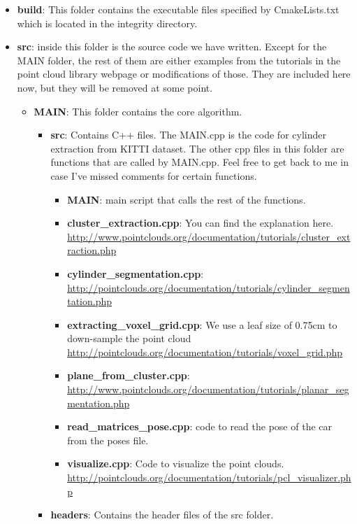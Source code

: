 \documentclass[twoside]{article}
\begin{document}
\begin{itemize}
\item \textbf{build}: This folder contains the executable files specified by CmakeLists.txt  which is located in the integrity directory.
\item \textbf{src}: inside this folder is the source code we have written. Except for the MAIN folder, the rest of them are either examples from the tutorials in the point cloud library webpage or modifications of those. They are included here now, but they will be removed at some point. 

\begin{itemize}
	\item \textbf{MAIN}: This folder contains the core algorithm. 
	\begin{itemize}
		\item \textbf{src}: Contains C++ files. The MAIN.cpp is the code for cylinder extraction from KITTI dataset. The other cpp files in this folder are functions that are called by MAIN.cpp. Feel free to get back to me in case I’ve missed comments for certain functions.
		\begin{itemize}
			\item \textbf{MAIN}: main script that calls the rest of the functions.
			\item \textbf{cluster\_extraction.cpp}: You can find the explanation here. \url{http://www.pointclouds.org/documentation/tutorials/cluster_extraction.php}
			\item \textbf{cylinder\_segmentation.cpp}: \url{http://pointclouds.org/documentation/tutorials/cylinder\_segmentation.php}
			\item \textbf{extracting\_voxel\_grid.cpp}: We use a leaf size of 0.75cm to down-sample the point cloud \url{http://pointclouds.org/documentation/tutorials/voxel\_grid.php}
			\item \textbf{plane\_from\_cluster.cpp}: \url{http://www.pointclouds.org/documentation/tutorials/planar_segmentation.php}
			\item \textbf{read\_matrices\_pose.cpp}: code to read the pose of the car from the poses file.
			\item \textbf{visualize.cpp}: Code to visualize the point clouds. \url{http://pointclouds.org/documentation/tutorials/pcl_visualizer.php}
		\end{itemize}
		\item \textbf{headers}: Contains the header files of the src folder.
	\end{itemize}
\end{itemize}

\end{itemize}
\end{document}
